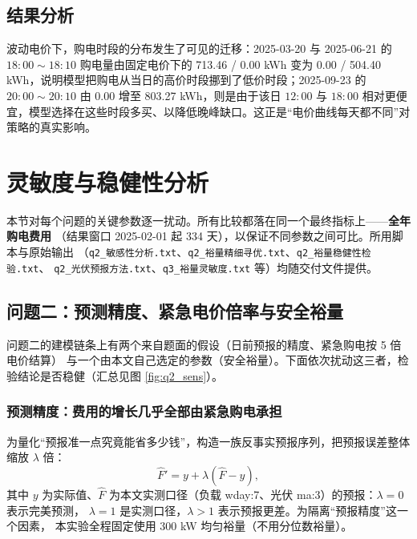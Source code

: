 \documentclass{cumcmthesis}
\begin{document}
\subsection{结果分析}
波动电价下，购电时段的分布发生了可见的迁移：2025-03-20 与 2025-06-21 的 $18{:}00\sim18{:}10$ 购电量由固定电价下的 713.46 / 0.00 kWh 变为 0.00 / 504.40 kWh，说明模型把购电从当日的高价时段挪到了低价时段；2025-09-23 的 $20{:}00\sim20{:}10$ 由 0.00 增至 803.27 kWh，则是由于该日 $12{:}00$ 与 $18{:}00$ 相对更便宜，模型选择在这些时段多买、以降低晚峰缺口。这正是“电价曲线每天都不同”对策略的真实影响。

\section{灵敏度与稳健性分析}
本节对每个问题的关键参数逐一扰动。所有比较都落在同一个最终指标上——\textbf{全年购电费用}
（结果窗口 2025-02-01 起 334 天），以保证不同参数之间可比。所用脚本与原始输出
（\texttt{q2\_敏感性分析.txt}、\texttt{q2\_裕量精细寻优.txt}、\texttt{q2\_裕量稳健性检验.txt}、
\texttt{q2\_光伏预报方法.txt}、\texttt{q3\_裕量灵敏度.txt} 等）均随交付文件提供。

\subsection{问题二：预测精度、紧急电价倍率与安全裕量}
问题二的建模链条上有两个来自题面的假设（日前预报的精度、紧急购电按 5 倍电价结算）
与一个由本文自己选定的参数（安全裕量）。下面依次扰动这三者，检验结论是否稳健（汇总见图 \ref{fig:q2_sens}）。

\subsubsection{预测精度：费用的增长几乎全部由紧急购电承担}
为量化“预报准一点究竟能省多少钱”，构造一族反事实预报序列，把预报误差整体缩放 $\lambda$ 倍：
\begin{equation}
    \hat F' = y + \lambda\left(\hat F - y\right),
    \label{eq:lam}
\end{equation}
其中 $y$ 为实际值、$\hat F$ 为本文实测口径（负载 wday:7、光伏 ma:3）的预报：$\lambda=0$ 表示完美预测，
$\lambda=1$ 是实测口径，$\lambda>1$ 表示预报更差。为隔离“预报精度”这一个因素，
本实验全程固定使用 300 kW 均匀裕量（不用分位数裕量）。
\end{document}
